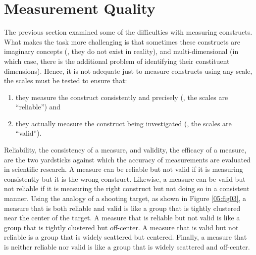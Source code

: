 \section{Measurement Quality}

The previous section examined some of the difficulties with measuring constructs. What makes the task more challenging is that sometimes these constructs are imaginary concepts (\ie, they do not exist in reality), and multi-dimensional (in which case, there is the additional problem of identifying their constituent dimensions). Hence, it is not adequate just to measure constructs using any scale, the scales must be tested to ensure that: 

\begin{enumerate}
	\item they measure the construct consistently and precisely (\ie, the scales are ``reliable'') and 

	\item they actually measure the construct being investigated (\ie, the scales are ``valid''). 
\end{enumerate}

Reliability, the consistency of a measure, and validity, the efficacy of a measure, are the two yardsticks against which the accuracy of measurements are evaluated in scientific research. A measure can be reliable but not valid if it is measuring consistently but it is the wrong construct. Likewise, a measure can be valid but not reliable if it is measuring the right construct but not doing so in a consistent manner. Using the analogy of a shooting target, as shown in Figure \ref{05:fig03}, a measure that is both reliable and valid is like a group that is tightly clustered near the center of the target. A measure that is reliable but not valid is like a group that is tightly clustered but off-center. A measure that is valid but not reliable is a group that is widely scattered but centered. Finally, a measure that is neither reliable nor valid is like a group that is widely scattered and off-center. 

